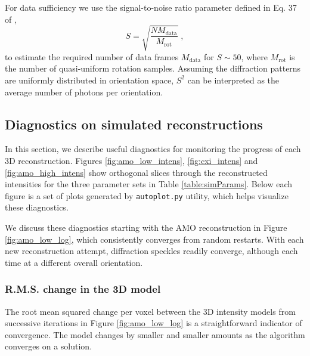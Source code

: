 \documentclass[]{iucr}              %
\begin{document}
For data sufficiency we use the signal-to-noise ratio parameter defined in Eq. 37 of , 
\begin{equation}
S = \sqrt{\frac{N M_{\text{data}}}{M_{\text{rot}}}}\; ,
\end{equation}
to estimate the required number of data frames $M_{\text{data}}$ for $S\sim50$, where $M_{\text{rot}}$ is the number of quasi-uniform rotation samples. Assuming the diffraction patterns are uniformly distributed in orientation space, $S^2$ can be interpreted as the average number of photons per orientation.

\subsection{Diagnostics on simulated reconstructions} \label{subsec:recon}
In this section, we describe useful diagnostics for monitoring the progress of each 3D reconstruction. Figures \ref{fig:amo_low_intens}, \ref{fig:cxi_intens} and \ref{fig:amo_high_intens} show orthogonal slices through the reconstructed intensities for the three parameter sets in Table \ref{table:simParams}. Below each figure is a set of plots generated by \texttt{autoplot.py} utility, which helps visualize these diagnostics. 

We discuss these diagnostics starting with the AMO reconstruction in Figure \ref{fig:amo_low_log}, which consistently converges from random restarts. With each new reconstruction attempt, diffraction speckles readily converge, although each time at a different overall orientation.

\subsubsection{R.M.S. change in the 3D model}
The root mean squared change per voxel between the 3D intensity models from successive iterations in Figure \ref{fig:amo_low_log} is a straightforward indicator of convergence. The model changes by smaller and smaller amounts as the algorithm converges on a solution.
\end{document}
